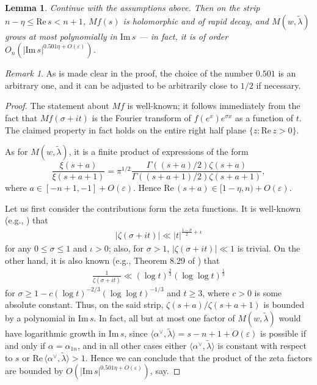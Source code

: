 \documentclass[11pt]{amsart}
\newtheorem{lemma}[theorem]{Lemma}
\numberwithin{theorem}{section}
\numberwithin{equation}{section}
\theoremstyle{remark}
\newtheorem*{remark}{Remark}
\theoremstyle{definition}
\newcommand{\re}{\mathrm{Re}\,}
\newcommand{\im}{\mathrm{Im}\,}
\begin{document}
\begin{lemma}\label{lemma:misc_growth}
Continue with the assumptions above. Then on the strip $n-\eta \leq \re s < n+1$, $Mf(s)$ is holomorphic and of rapid decay, and $M(w, \tilde\lambda)$ grows at most polynomially in $\im s$ --- in fact, it is of order $O_n(|\im s|^{0.501\eta+O(\varepsilon)})$.
\end{lemma}
\begin{remark}
As is made clear in the proof, the choice of the number $0.501$ is an arbitrary one, and it can be adjusted to be arbitrarily close to $1/2$ if necessary.
\end{remark}
\begin{proof}
The statement about $Mf$ is well-known; it follows immediately from the fact that $Mf(\sigma + it)$ is the Fourier transform of $f(e^x)e^{\sigma x}$ as a function of $t$. The claimed property in fact holds on the entire right half plane $\{z:\re z>0\}$.

As for $M(w, \tilde\lambda)$, it is a finite product of expressions of the form
\begin{equation*}
\frac{\xi(s+a)}{\xi(s+a+1)} = \pi^{1/2}\frac{\Gamma((s+a)/2)\zeta(s+a)}{\Gamma((s+a+1)/2)\zeta(s+a+1)},
\end{equation*}
where $a \in [-n+1,-1] + O(\varepsilon)$. Hence $\re (s+a) \in [1-\eta,n)+O(\varepsilon)$. 

Let us first consider the contributions form the zeta functions. It is well-known (e.g., \cite[Exercise 10.1.19e]{MV06}) that
\begin{align*}
|\zeta(\sigma+it)| \ll |t|^{\frac{1-\sigma}{2}+\iota}
\end{align*}
for any $0 \leq \sigma \leq 1$ and $\iota>0$; also, for $\sigma >1$, $|\zeta(\sigma+it)| \ll 1$ is trivial.
On the other hand, it is also known (e.g., Theorem 8.29 of \cite{IK04}) that
\begin{align*}
\frac{1}{\zeta(\sigma+it)} \ll (\log t)^\frac{2}{3}(\log\log t)^\frac{1}{3}
\end{align*}
for $\sigma \geq 1-c(\log t)^{-2/3}(\log\log t)^{-1/3}$ and $t \geq 3$, where $c>0$ is some absolute constant. Thus, on the said strip, $\zeta(s+a)/\zeta(s+a+1)$ is bounded by a polynomial in $\im s$. In fact, all but at most one factor of $M(w,\tilde\lambda)$ would have logarithmic growth in $\im s$, since $\langle \alpha^\vee,\tilde\lambda \rangle = s-n+1+O(\varepsilon)$ is possible if and only if $\alpha = \alpha_{1n}$, and in all other cases either $\langle \alpha^\vee,\tilde\lambda\rangle$ is constant with respect to $s$ or $\re\langle \alpha^\vee,\tilde\lambda\rangle >1$. Hence we can conclude that the product of the zeta factors are bounded by $O(|\im s|^{0.501\eta+O(\varepsilon)})$, say.


\end{proof}
\end{document}
